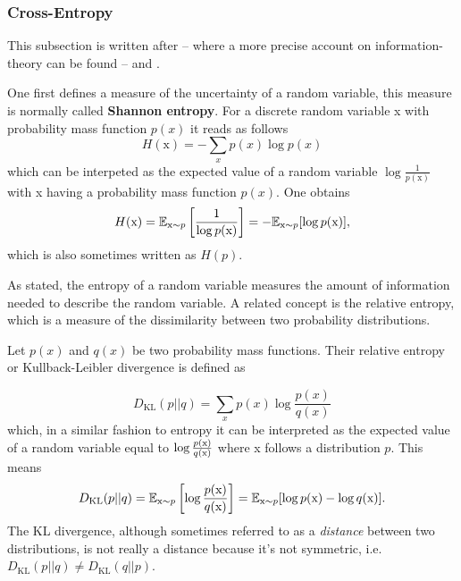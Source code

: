 \subsubsection{Cross-Entropy}
This subsection is written after \citet{Cover2006ElementsTheory} -- where a more precise account on information-theory can be found --  and \citet{Goodfellow2016}.

One first defines a measure of the uncertainty of a random variable, this measure is normally called \textbf{Shannon entropy}. For a discrete random variable x with probability mass function $p(x)$ it reads as follows
\begin{equation}
    H(\text{x}) = - \sum_x p(x) \log p(x)
\end{equation}
which can be interpeted as the expected value of a random variable $\log \frac{1}{p(\text{x})}$ with x having a probability mass function $p(x)$. One obtains
\begin{equation} \label{eq:entropy}
    H(\text{x}) = \mathbb{E}_{\text{x}\sim p}\left[\dfrac{1}{\log p(\text x)}\right] = -\mathbb{E}_{\text{x}\sim p}[\log p(\text x)],
\end{equation}
which is also sometimes written as $H(p)$.

As stated, the entropy of a random variable measures the amount of information needed to describe the random variable. A related concept is the relative entropy, which is a measure of the dissimilarity between two probability distributions. 

Let $p(x)$ and $q(x)$ be two probability mass functions. Their relative entropy or Kullback-Leibler divergence is defined as

\begin{equation} 
    D_{\text{KL}}(p||q) = \sum_x p(x) \log \dfrac{p(x)}{q(x)}
\end{equation}
which, in a similar fashion to entropy it can be interpreted as the expected value of a random variable equal to $\log \frac{p(\text x)}{q(\text x)}$ where x follows a distribution $p$. This means
\begin{equation} \label{eq:dkl}
   D_{\text{KL}}(p||q) = \mathbb{E}_{\text x\sim p} \left[\log \dfrac{p(\text x)}{q(\text x)}\right] = \mathbb{E}_{\text x\sim p}[\log p(\text x) - \log q(\text x)].
\end{equation}
The KL divergence, although sometimes referred to as a \textit{distance} between two distributions, is not really a distance because it's not symmetric, i.e. $D_{\text{KL}}(p||q) \neq D_{\text{KL}}(q||p)$.

